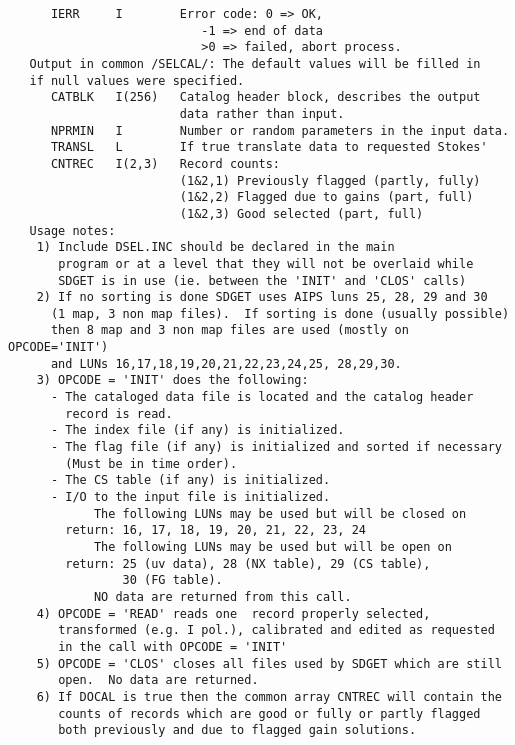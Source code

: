 \begin{verbatim}
      IERR     I        Error code: 0 => OK,
                           -1 => end of data
                           >0 => failed, abort process.
   Output in common /SELCAL/: The default values will be filled in
   if null values were specified.
      CATBLK   I(256)   Catalog header block, describes the output
                        data rather than input.
      NPRMIN   I        Number or random parameters in the input data.
      TRANSL   L        If true translate data to requested Stokes'
      CNTREC   I(2,3)   Record counts:
                        (1&2,1) Previously flagged (partly, fully)
                        (1&2,2) Flagged due to gains (part, full)
                        (1&2,3) Good selected (part, full)
   Usage notes:
    1) Include DSEL.INC should be declared in the main
       program or at a level that they will not be overlaid while
       SDGET is in use (ie. between the 'INIT' and 'CLOS' calls)
    2) If no sorting is done SDGET uses AIPS luns 25, 28, 29 and 30
      (1 map, 3 non map files).  If sorting is done (usually possible)
      then 8 map and 3 non map files are used (mostly on OPCODE='INIT')
      and LUNs 16,17,18,19,20,21,22,23,24,25, 28,29,30.
    3) OPCODE = 'INIT' does the following:
      - The cataloged data file is located and the catalog header
        record is read.
      - The index file (if any) is initialized.
      - The flag file (if any) is initialized and sorted if necessary
        (Must be in time order).
      - The CS table (if any) is initialized.
      - I/O to the input file is initialized.
            The following LUNs may be used but will be closed on
        return: 16, 17, 18, 19, 20, 21, 22, 23, 24
            The following LUNs may be used but will be open on
        return: 25 (uv data), 28 (NX table), 29 (CS table),
                30 (FG table).
            NO data are returned from this call.
    4) OPCODE = 'READ' reads one  record properly selected,
       transformed (e.g. I pol.), calibrated and edited as requested
       in the call with OPCODE = 'INIT'
    5) OPCODE = 'CLOS' closes all files used by SDGET which are still
       open.  No data are returned.
    6) If DOCAL is true then the common array CNTREC will contain the
       counts of records which are good or fully or partly flagged
       both previously and due to flagged gain solutions.
\end{verbatim}

